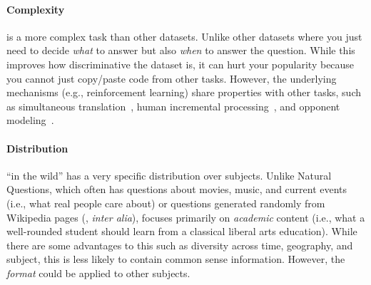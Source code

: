 \paragraph{Complexity} 

\qb{} is a more complex task than other datasets.  
Unlike other datasets where you just need to decide \emph{what} to answer but also \emph{when} to answer the question.
While this improves how discriminative the dataset is, it can hurt your popularity because you cannot just copy/paste code from other  tasks.
However, the underlying mechanisms (e.g., reinforcement learning) share properties with other tasks, such as simultaneous translation~\cite{grissom:he:boyd-graber:morgan-2014,ma-etal-2019-stacl}, human incremental processing~\cite{levy-08,levy-11}, and opponent modeling~\cite{he-16}.


\paragraph{Distribution} 

\qb{} ``in the wild'' has a very specific distribution over subjects.
Unlike Natural Questions, which often has questions about movies, music, and current events (i.e., what real people care about)
or questions generated randomly from Wikipedia pages (\squad{}, \textit{inter alia}),
\qb{} focuses primarily on \emph{academic} content (i.e., what a well-rounded student should learn from a classical liberal arts education).
While there are some advantages to this such as diversity across time, geography, and subject, this is less likely to contain common sense information.
However, the \qb{} \emph{format} could be applied to other subjects.


